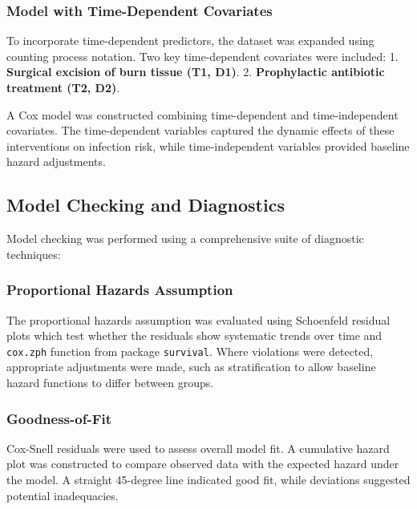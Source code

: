 \documentclass[12pt]{article}
\begin{document}
\subsubsection{\texorpdfstring{\textbf{Model with Time-Dependent
Covariates}}{Model with Time-Dependent Covariates}}\label{model-with-time-dependent-covariates}

To incorporate time-dependent predictors, the dataset was expanded using
counting process notation. Two key time-dependent covariates were
included: 1. \textbf{Surgical excision of burn tissue (T1, D1)}. 2.
\textbf{Prophylactic antibiotic treatment (T2, D2)}.

A Cox model was constructed combining time-dependent and
time-independent covariates. The time-dependent variables captured the
dynamic effects of these interventions on infection risk, while
time-independent variables provided baseline hazard adjustments.

\subsection{\texorpdfstring{\textbf{Model Checking and
Diagnostics}}{Model Checking and Diagnostics}}\label{model-checking-and-diagnostics}

Model checking was performed using a comprehensive suite of diagnostic
techniques:

\subsubsection{\texorpdfstring{\textbf{Proportional Hazards
Assumption}}{Proportional Hazards Assumption}}\label{proportional-hazards-assumption}

The proportional hazards assumption was evaluated using Schoenfeld
residual plots which test whether the residuals show systematic trends
over time and \texttt{cox.zph} function from package \texttt{survival}.
Where violations were detected, appropriate adjustments were made, such
as stratification to allow baseline hazard functions to differ between
groups.

\subsubsection{\texorpdfstring{\textbf{Goodness-of-Fit}}{Goodness-of-Fit}}\label{goodness-of-fit}

Cox-Snell residuals were used to assess overall model fit. A cumulative
hazard plot was constructed to compare observed data with the expected
hazard under the model. A straight 45-degree line indicated good fit,
while deviations suggested potential inadequacies.
\end{document}
